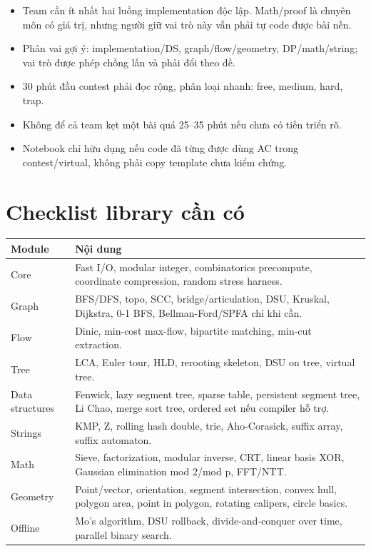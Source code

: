 \documentclass[11pt,a4paper]{article}
\begin{document}
\begin{itemize}
  \item Team cần ít nhất hai luồng implementation độc lập. Math/proof là chuyên môn có giá trị, nhưng người giữ vai trò này vẫn phải tự code được bài nền.
  \item Phân vai gợi ý: implementation/DS, graph/flow/geometry, DP/math/string; vai trò được phép chồng lấn và phải đổi theo đề.
  \item 30 phút đầu contest phải đọc rộng, phân loại nhanh: free, medium, hard, trap.
  \item Không để cả team kẹt một bài quá 25--35 phút nếu chưa có tiến triển rõ.
  \item Notebook chỉ hữu dụng nếu code đã từng được dùng AC trong contest/virtual, không phải copy template chưa kiểm chứng.
\end{itemize}

\section{Checklist library cần có}

\begin{longtable}{p{4.0cm}p{9.9cm}}
\toprule
\textbf{Module} & \textbf{Nội dung}\\
\midrule
Core & Fast I/O, modular integer, combinatorics precompute, coordinate compression, random stress harness.\\
Graph & BFS/DFS, topo, SCC, bridge/articulation, DSU, Kruskal, Dijkstra, 0-1 BFS, Bellman-Ford/SPFA chỉ khi cần.\\
Flow & Dinic, min-cost max-flow, bipartite matching, min-cut extraction.\\
Tree & LCA, Euler tour, HLD, rerooting skeleton, DSU on tree, virtual tree.\\
Data structures & Fenwick, lazy segment tree, sparse table, persistent segment tree, Li Chao, merge sort tree, ordered set nếu compiler hỗ trợ.\\
Strings & KMP, Z, rolling hash double, trie, Aho-Corasick, suffix array, suffix automaton.\\
Math & Sieve, factorization, modular inverse, CRT, linear basis XOR, Gaussian elimination mod 2/mod p, FFT/NTT.\\
Geometry & Point/vector, orientation, segment intersection, convex hull, polygon area, point in polygon, rotating calipers, circle basics.\\
Offline & Mo's algorithm, DSU rollback, divide-and-conquer over time, parallel binary search.\\
\bottomrule
\end{longtable}
\end{document}
